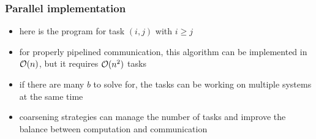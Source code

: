 \begin{frame}[fragile]
%
  \frametitle{Parallel implementation}
%
  \begin{itemize}
  \item here is the program for task $(i,j)$ with $i \geq j$
%
  \begin{center}
    \footnotesize
    \begin{minipage}{.85\linewidth}
      \begin{algorithm}[H]
%
        \DontPrintSemicolon
        \NoCaptionOfAlgo
        \SetAlCapHSkip{0ex}
%
         
% 
      \end{algorithm}
    \end{minipage}
  \end{center}
%
  \item for properly pipelined communication, this algorithm can be implemented in $\mbox{$\mathcal{O}(n)$}$,
    but it requires $\mbox{$\mathcal{O}(n^{2})$}$ tasks
  \item if there are many $b$ to solve for, the tasks can be working on multiple systems at
    the same time
  \item coarsening strategies can manage the number of tasks and improve the balance between
    computation and communication
  \end{itemize}
%
\end{frame}

